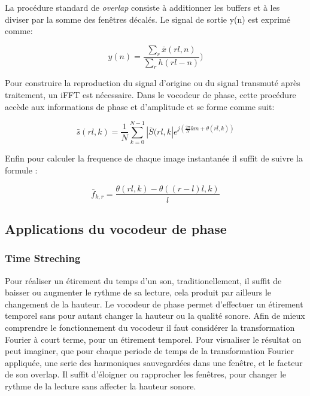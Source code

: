 La procédure standard de \textit{overlap} consiste à additionner les buffers et à les diviser par la somme des fenêtres décalés. Le signal de sortie y(n) est exprimé comme:

\begin{equation}
    y(n) = \frac{\sum_r \bar{x}(rl,n)}{\sum_r {h}(rl - n)})
\end{equation}

Pour construire la reproduction du signal d'origine ou du signal transmuté après traitement, un iFFT est nécessaire. Dans le vocodeur de phase, cette procédure accède aux informations de phase et d'amplitude et se forme comme suit:

\begin{equation}
    \bar{s}(rl,k) = \frac{1}{N}\sum_{k=0}^{N-1} |\bar{S}(rl,k| e^{j (\frac{2 \pi}{N} km + \theta(r \bar{l},k))}
\end{equation}

Enfin pour calculer la frequence de chaque image instantanée il suffit de suivre la formule :

\begin{equation}
    \bar{f}_{k,r} = \frac{\theta(rl,k) - \theta((r - l )l,k)}{l}
\end{equation}



\subsection{Applications du vocodeur de phase} 

    \subsubsection{Time Streching}




Pour réaliser un étirement du temps d'un son, traditionellement, il suffit de baisser ou augmenter le rythme de sa lecture, cela produit par ailleurs le changement de la hauteur. Le vocodeur de phase permet d'effectuer un étirement temporel sans pour autant changer la hauteur ou la qualité sonore. Afin de mieux comprendre le fonctionnement du vocodeur il faut considérer la transformation Fourier à court terme, pour un étirement temporel. Pour visualiser le résultat on peut imaginer, que pour chaque periode de temps de la transformation Fourier appliquée, une serie des harmoniques sauvegardées dans une fenêtre, et le facteur de son overlap. Il suffit d'éloigner ou rapprocher les fenêtres, pour changer le rythme de la lecture sans affecter la hauteur sonore.

